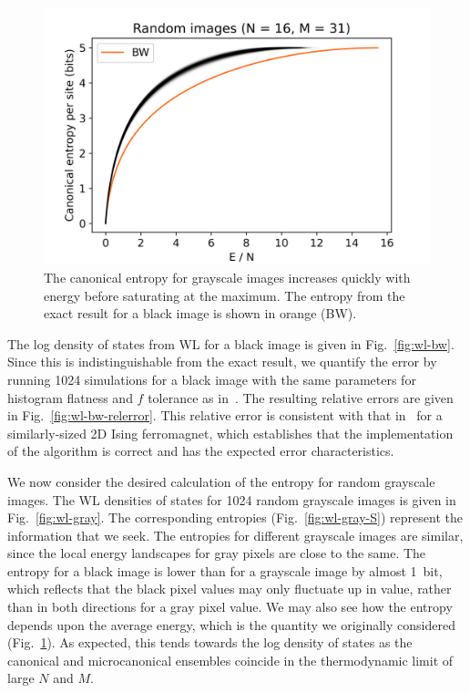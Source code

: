 \documentclass[aps,reprint,floatfix]{revtex4-2}
\theoremstyle{plain}
\theoremstyle{definition}
\begin{document}
\begin{figure}
  \centering
  \includegraphics[width=\linewidth]{wanglandau-gray-ES}
  \caption{The canonical entropy for grayscale images increases quickly with
    energy before saturating at the maximum. The entropy from the exact result
  for a black image is shown in orange (BW).}\label{fig:wl-gray-ES}
\end{figure}

The log density of states from WL for a black image is given in
Fig.~\ref{fig:wl-bw}. Since this is indistinguishable from the exact result, we
quantify the error by running \num{1024} simulations for a black image with the
same parameters for histogram flatness and $f$ tolerance as
in~\cite{wanglandau-ajp}. The resulting relative errors are given in
Fig.~\ref{fig:wl-bw-relerror}. This relative error is consistent with that
in~\cite{wanglandau-ajp} for a similarly-sized 2D Ising ferromagnet, which
establishes that the implementation of the algorithm is correct and has the
expected error characteristics.

We now consider the desired calculation of the entropy for random grayscale
images. The WL densities of states for \num{1024} random grayscale images is
given in Fig.~\ref{fig:wl-gray}. The corresponding entropies
(Fig.~\ref{fig:wl-gray-S}) represent the information that we seek. The
entropies for different grayscale images are similar, since the local energy
landscapes for gray pixels are close to the same. The entropy for a black image
is lower than for a grayscale image by almost \SI{1}{bit}, which reflects that
the black pixel values may only fluctuate up in value, rather than in both
directions for a gray pixel value. We may also see how the entropy depends upon
the average energy, which is the quantity we originally considered
(Fig.~\ref{fig:wl-gray-ES}). As expected, this tends towards the log density of
states as the canonical and microcanonical ensembles coincide in the
thermodynamic limit of large $N$ and $M$.
\end{document}
